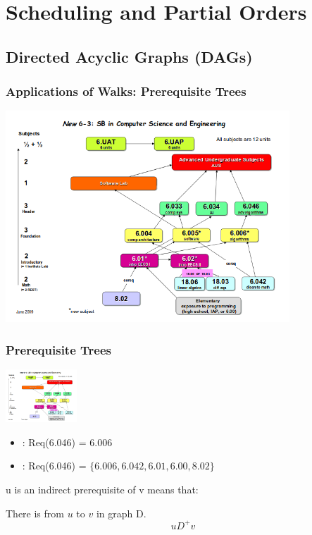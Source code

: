 \documentclass{beamer}
\begin{document}
\section{Scheduling and Partial Orders}
\subsection{Directed Acyclic Graphs (DAGs)}

\begin{frame}
  \frametitle{Applications of Walks: Prerequisite Trees}
  \begin{center}
    \includegraphics[width=0.8\textwidth]{../img/MIT_prereq}
  \end{center}
\end{frame}

\begin{frame}
  \frametitle{Prerequisite Trees}
  \includegraphics[width=0.2\textwidth]{../img/MIT_prereq}

  {\larger
    \begin{itemize}
    \item {}: Req(6.046) = 6.006
    \item {}: Req(6.046) = $\{6.006, 6.042, 6.01, 6.00, 8.02\}$
    \end{itemize}

    \vfill

    u is an indirect prerequisite of v means that:

    \bigskip

    \begin{center}
      There is  from $u$ to $v$ in
      graph D.
      \begin{equation*}
        u D^+ v
      \end{equation*}
    \end{center}
  }
\end{frame}
\end{document}
